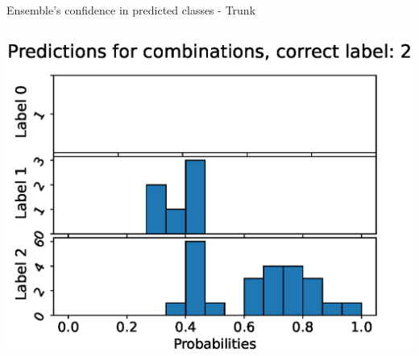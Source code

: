 \begin{frame}[fragile]{Ensemble's confidence in predicted classes - Trunk}
\begin{columns}[T,onlytextwidth]
      \includegraphics[width=\textwidth]{files/figs/res/trunk/pc2.eps}
  \end{columns}
\end{frame}

